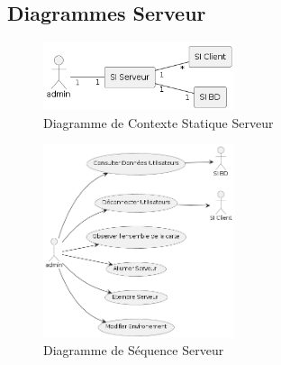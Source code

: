\documentclass[12pt,a4paper]{scrartcl}
\begin{document}
\subsection{Diagrammes Serveur}
\begin{figure}[h]
    \centering
    \includegraphics[width=0.5\textwidth]{DiagCS_Admin.png}
    \caption{Diagramme de Contexte Statique Serveur}\label{cs_serv}
\end{figure}

\begin{figure}[h]
    \centering
    \includegraphics[width=0.5\textwidth]{Diag_Seq_Admin.png}
    \caption{Diagramme de Séquence Serveur}\label{cs_serv}
\end{figure}
\end{document}
